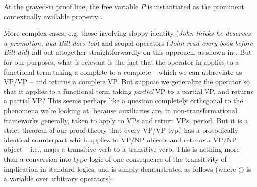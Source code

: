 \documentclass[output=paper,colorlinks,citecolor=brown]{langscibook}
\begin{document}
\noindent At the grayed-in proof line, the free variable $P$ is instantiated as
the prominent contextually available property .

More complex cases, e.g. those involving sloppy identity (\textit{John thinks
he deserves a promotion, and Bill does too}) and scopal operators
(\textit{John read every book before Bill did}) fall out altogether
straightforwardly on this approach, as shown in
\citet[236--238]{kubota-levine-pseudo}. But for our purposes, what is relevant
is the fact that the operator in  applies to a functional
term taking a complete  to a complete  -- which we can
abbreviate as VP/VP -- and returns a complete VP. But suppose
we generalize the operator so that it applies to a functional term
taking \textsl{partial} VP to a partial VP, and returns a partial VP?
This seems perhaps like a question completely orthogonal to the
phenomena we're looking at, because auxiliaries are, in
non-transformational frameworks generally, taken to apply to VPs and
return VPs, period. But it is a strict theorem of our proof theory
that every VP/VP type has a prosodically identical counterpart which
applies to VP/NP objects and returns a VP/NP object -- i.e., maps a
transitive verb to a transitive verb. This is nothing more than a
conversion into type logic of one consequence of the transitivity of
implication in standard logics, and is simply demonstrated as follows
(where $\bigcirc$ is a variable over arbitrary operators):
\end{document}
